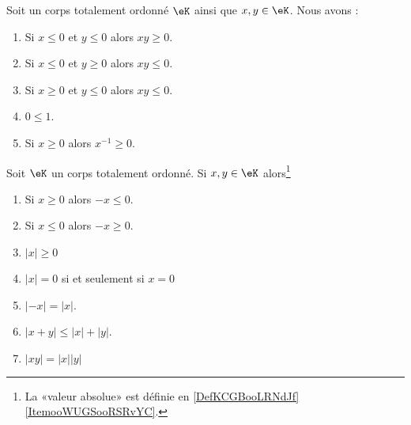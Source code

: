 \begin{lemma}        \label{LEMooXJTAooZauchx}
	Soit un corps totalement ordonné \( \eK\) ainsi que \( x,y\in \eK\). Nous avons :
	\begin{enumerate}
		\item
		      Si \( x\leq 0\) et \( y\leq 0\) alors \( xy\geq 0\).
		\item
		      Si \( x\leq 0\) et \( y\geq 0\) alors \( xy\leq 0\).
		\item
		      Si \( x\geq 0\) et \( y\leq 0\) alors \( xy\leq 0\).
		\item       \label{ITEMooRGYAooCUIfss}
		      \( 0\leq 1\).
		\item       \label{ITEMooMRNHooLglPKn}
		      Si \( x\geq 0\) alors \( x^{-1}\geq 0\).
	\end{enumerate}
\end{lemma}

\begin{lemma}  \label{LemooANTJooYxQZDw}
	Soit \( \eK\) un corps totalement ordonné. Si \( x,y\in \eK\) alors\footnote{La «valeur absolue» est définie en \eqref{DefKCGBooLRNdJf}\ref{ItemooWUGSooRSRvYC}.}
	\begin{enumerate}
		\item       \label{ItemooNVDIooSuiSoB}
		      Si \( x\geq 0\) alors \( -x\leq 0\).
		\item       \label{ITEMooVNAZooSxmtuH}
		      Si \( x\leq 0\) alors \( -x\geq 0\).
		\item       \label{ITEMooSDNHooDnjScE}
		      \( | x |\geq 0\)
		\item       \label{ITEMooLQLTooTJTPVM}
		      \( | x |=0\) si et seulement si \( x=0\)
		\item       \label{ITEMooVJAEooOEatzY}
		      \( | -x |=| x |\).
		\item\label{ItemooOMKNooRlanvk}
		      \( | x+y |\leq | x |+| y |\).
		\item\label{ITEMooEFMLooYVCuHD}
            \( | xy |=| x | |y |\)
	\end{enumerate}
\end{lemma}

